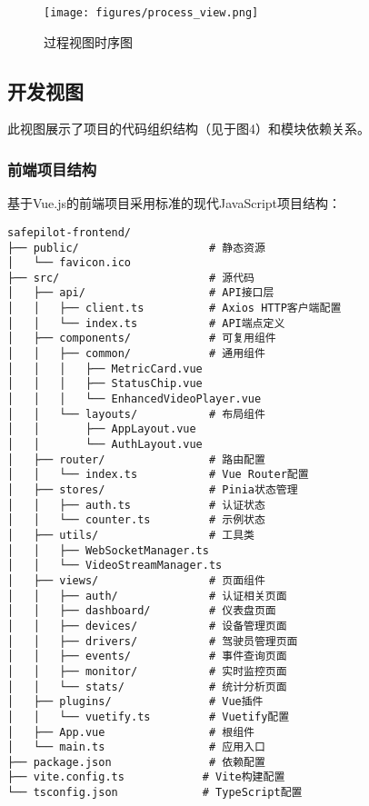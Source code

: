 \documentclass[a4paper,12pt]{article}
\begin{document}
\begin{figure}[h]
  \centering
  \texttt{[image: figures/process\_view.png]}
  \caption{过程视图时序图}
  \label{fig:process_view}
\end{figure}

\subsection{开发视图}
此视图展示了项目的代码组织结构（见于图4）和模块依赖关系。

\subsubsection{前端项目结构}
基于Vue.js的前端项目采用标准的现代JavaScript项目结构：

\begin{lstlisting}[caption=前端项目目录结构]
safepilot-frontend/
├── public/                    # 静态资源
│   └── favicon.ico
├── src/                       # 源代码
│   ├── api/                   # API接口层
│   │   ├── client.ts          # Axios HTTP客户端配置
│   │   └── index.ts           # API端点定义
│   ├── components/            # 可复用组件
│   │   ├── common/            # 通用组件
│   │   │   ├── MetricCard.vue
│   │   │   ├── StatusChip.vue
│   │   │   └── EnhancedVideoPlayer.vue
│   │   └── layouts/           # 布局组件
│   │       ├── AppLayout.vue
│   │       └── AuthLayout.vue
│   ├── router/                # 路由配置
│   │   └── index.ts           # Vue Router配置
│   ├── stores/                # Pinia状态管理
│   │   ├── auth.ts            # 认证状态
│   │   └── counter.ts         # 示例状态
│   ├── utils/                 # 工具类
│   │   ├── WebSocketManager.ts
│   │   └── VideoStreamManager.ts
│   ├── views/                 # 页面组件
│   │   ├── auth/              # 认证相关页面
│   │   ├── dashboard/         # 仪表盘页面
│   │   ├── devices/           # 设备管理页面
│   │   ├── drivers/           # 驾驶员管理页面
│   │   ├── events/            # 事件查询页面
│   │   ├── monitor/           # 实时监控页面
│   │   └── stats/             # 统计分析页面
│   ├── plugins/               # Vue插件
│   │   └── vuetify.ts         # Vuetify配置
│   ├── App.vue                # 根组件
│   └── main.ts                # 应用入口
├── package.json               # 依赖配置
├── vite.config.ts            # Vite构建配置
└── tsconfig.json             # TypeScript配置
\end{lstlisting}
\end{document}
